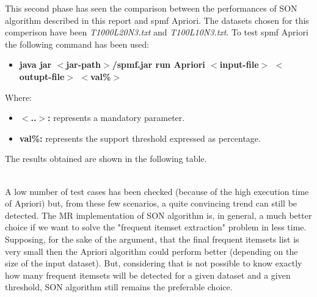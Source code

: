 \documentclass[]{report}
\begin{document}
   	This second phase has seen the comparison between the performances of SON algorithm described in this report and spmf Apriori. The datasets chosen for this comperison have been \textit{T1000L20N3.txt} and \textit{T100L10N3.txt}. To test spmf Apriori the following command has been used:
   	\begin{itemize}
   		\item \textbf{ java jar $<$jar-path$>$/spmf.jar run Apriori $<$input-file$>$ $<$outupt-file$>$ $<$val\%$>$}
   	\end{itemize}
   	Where:
   	\begin{itemize}	
   		\item \textbf{$<$..$>$:} represents a mandatory parameter.
   		\item \textbf{val\%:} represents the support threshold expressed as percentage.
   	\end{itemize}
   	The results obtained are shown in the following table.
   	\begin{figure}[h]
   		\centering
   	\end{figure}
   	\vspace{-0.5cm}
   	\\ 
   	A low number of test cases has been checked (because of the high execution time of Apriori) but, from these few scenarios, a quite convincing trend can still be detected. The MR implementation of SON algorithm is, in general, a much better choice if we want to solve the "frequent itemset extraction" problem in less time. Supposing, for the sake of the argument, that the final frequent itemsets list is very small then the Apriori algorithm could perform better (depending on the size of the input dataset). But, considering that is not possible to know exactly how many frequent itemsets will be detected for a given dataset and a given threshold, SON algorithm still remains the preferable choice.     
   	
\end{document}
